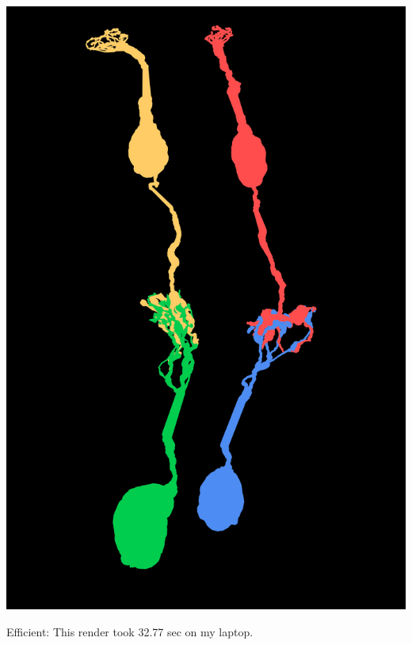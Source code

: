 \documentclass[11pt]{beamer}
\begin{document}
\begin{frame}
\begin{center}
		\includegraphics[height=0.7\textheight]{midgetBCGC2_k}
	\end{center}
	Efficient: This render took 32.77 sec on my laptop.
\end{frame}
\end{document}
